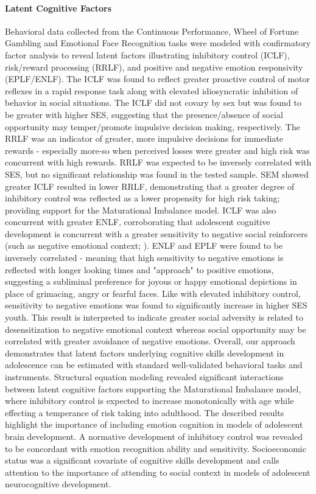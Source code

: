 \documentclass[utf8]{frontiersSCNS} %
\begin{document}
\paragraph*{Latent Cognitive Factors} Behavioral data collected from the Continuous Performance, Wheel of Fortune Gambling and Emotional Face Recognition tasks were modeled with confirmatory factor analysis to reveal latent factors illustrating inhibitory control (ICLF), risk/reward processing (RRLF), and positive and negative emotion responsivity (EPLF/ENLF). The ICLF was found to reflect greater proactive control of motor reflexes in a rapid response task along with elevated idiosyncratic inhibition of behavior in social situations. The ICLF did not covary by sex but was found to be greater with higher SES, suggesting that the presence/absence of social opportunity may temper/promote impulsive decision making, respectively. The RRLF was an indicator of greater, more impulsive decisions for immediate rewards - especially more-so when perceived losses were greater and high risk was concurrent with high rewards. RRLF was expected to be inversely correlated with SES, but no significant relationship was found in the tested sample. SEM showed greater ICLF resulted in lower RRLF, demonstrating that a greater degree of inhibitory control was reflected as a lower propensity for high risk taking; providing support for the Maturational Imbalance model. ICLF was also concurrent with greater ENLF, corroborating that adolescent cognitive development is concurrent with a greater sensitivity to negative social reinforcers (such as negative emotional context; \cite{jones2014adolescent, rosenbaum2020valence}). ENLF and EPLF were found to be inversely correlated - meaning that high sensitivity to negative emotions is reflected with longer looking times and "approach" to positive emotions, suggesting a subliminal preference for joyous or happy emotional depictions in place of grimacing, angry or fearful faces. Like with elevated inhibitory control, sensitivity to negative emotions was found to significantly increase in higher SES youth. This result is interpreted to indicate greater social adversity is related to desensitization to negative emotional context whereas social opportunity may be correlated with greater avoidance of negative emotions. Overall, our approach demonstrates that latent factors underlying cognitive skills development in adolescence can be estimated with standard well-validated behavioral tasks and instruments. Structural equation modeling revealed significant interactions between latent cognitive factors supporting the Maturational Imbalance model, where inhibitory control is expected to increase monotonically with age while effecting a temperance of risk taking into adulthood. The described results highlight the importance of including emotion cognition in models of adolescent brain development. A normative development of inhibitory control was revealed to be concordant with emotion recognition ability and sensitivity. Socioeconomic status was a significant covariate of cognitive skills development and calls attention to the importance of attending to social context in models of adolescent neurocognitive development.
\vspace{2pt}
\end{document}
